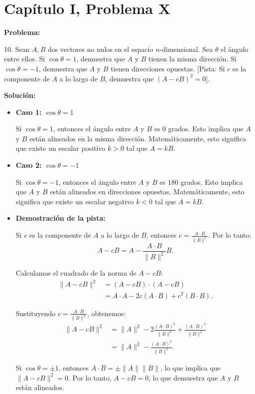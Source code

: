 \section*{Capítulo I, Problema X}

\textbf{Problema:}

10. Sean $A, B$ dos vectores no nulos en el espacio $n$-dimensional. Sea $\theta$ el ángulo entre ellos. Si $\cos \theta = 1$, demuestra que $A$ y $B$ tienen la misma dirección. Si $\cos \theta = -1$, demuestra que $A$ y $B$ tienen direcciones opuestas. [Pista: Si $c$ es la componente de $A$ a lo largo de $B$, demuestra que $(A - cB)^2 = 0$].

\textbf{Solución:}

\begin{itemize}
    \item \textbf{Caso 1: $\cos \theta = 1$}

    Si $\cos \theta = 1$, entonces el ángulo entre $A$ y $B$ es $0$ grados. Esto implica que $A$ y $B$ están alineados en la misma dirección. Matemáticamente, esto significa que existe un escalar positivo $k > 0$ tal que $A = kB$.

    \item \textbf{Caso 2: $\cos \theta = -1$}

    Si $\cos \theta = -1$, entonces el ángulo entre $A$ y $B$ es $180$ grados. Esto implica que $A$ y $B$ están alineados en direcciones opuestas. Matemáticamente, esto significa que existe un escalar negativo $k < 0$ tal que $A = kB$.

    \item \textbf{Demostración de la pista:}

    Si $c$ es la componente de $A$ a lo largo de $B$, entonces $c = \frac{A \cdot B}{\|B\|^2}$. Por lo tanto:
    \[
        A - cB = A - \frac{A \cdot B}{\|B\|^2}B.
    \]

    Calculamos el cuadrado de la norma de $A - cB$:
    \begin{align*}
        \|A - cB\|^2 &= (A - cB) \cdot (A - cB) \\
        &= A \cdot A - 2c(A \cdot B) + c^2(B \cdot B).
    \end{align*}

    Sustituyendo $c = \frac{A \cdot B}{\|B\|^2}$, obtenemos:
    \begin{align*}
        \|A - cB\|^2 &= \|A\|^2 - 2\frac{(A \cdot B)^2}{\|B\|^2} + \frac{(A \cdot B)^2}{\|B\|^2} \\
        &= \|A\|^2 - \frac{(A \cdot B)^2}{\|B\|^2}.
    \end{align*}

    Si $\cos \theta = \pm 1$, entonces $A \cdot B = \pm \|A\|\|B\|$, lo que implica que $\|A - cB\|^2 = 0$. Por lo tanto, $A - cB = 0$, lo que demuestra que $A$ y $B$ están alineados.
\end{itemize}